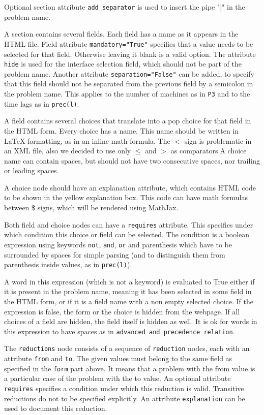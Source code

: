 \documentclass{article}
\begin{document}
Optional section attribute \texttt{add\_separator} is used to insert the pipe "|" in the problem name.

A section contains several fields.  Each field has a name as it appears in the HTML file.  Field attribute \texttt{mandatory="True"} specifies that a value needs to be selected for that field.  Otherwise leaving it blank is a valid option.  The attribute \texttt{hide} is used for the interface selection field, which should not be part of the problem name.  Another attribute \texttt{separation="False"} can be added, to specify that this field should not be separated from the previous field by a semicolon in the problem name.  This applies to the number of machines as in \texttt{P3} and to the time lags as in \texttt{prec(l)}.

A field contains several choices that translate into a pop choice for that field in the HTML form.  Every choice has a name. This name should be written in LaTeX formatting, as in an inline math formula.  The $<$ sign is problematic in an XML file, also we decided to use only $\leq$ and $>$ as comparators.A choice name can contain spaces, but should not have two consecutive spaces, nor trailing or leading spaces.

A choice node should have an explanation attribute, which contains HTML code to be shown in the yellow explanation box.  This code can have math formulas between \$ signs, which will be rendered using MathJax.

Both field and choice nodes can have a \texttt{requires} attribute. This specifies under which condition this choice or field can be selected.  The condition is a boolean expression using keywords \texttt{not}, \texttt{and}, \texttt{or} and parenthesis which have to be surrounded by spaces for simple parsing (and to distinguish them from parenthesis inside values, as in \texttt{prec(l)}).

A word in this expression (which is not a keyword) is evaluated to True either if it is present in the problem name, meaning it has been selected in some field in the HTML form, or if it is a field name with a non empty selected choice.  If the expression is false, the form or the choice is hidden from the webpage.  If all choices of a field are hidden, the field itself is hidden as well.  It is ok for words in this expression to have spaces as in \texttt{advanced and precedence relation}.

The \texttt{reductions} node consists of a sequence of \texttt{reduction} nodes, each with an attribute \texttt{from} and \texttt{to}.  The given values must belong to the same field as specified in the \texttt{form} part above.  It means that a problem with the from value is a particular case of the problem with the to value.  An optional attribute \texttt{requires} specifies a condition under which this reduction is valid.  Transitive reductions do not to be specified explicitly.  An attribute \texttt{explanation} can be used to document this reduction.
\end{document}
